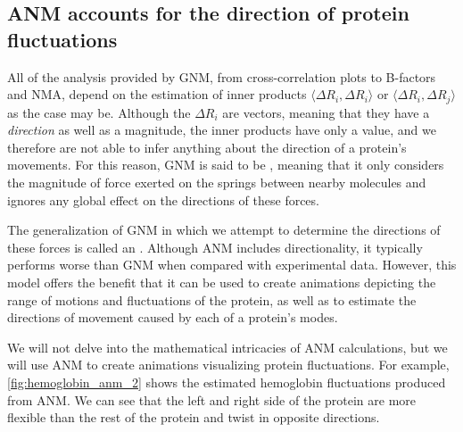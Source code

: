 \subsection{ANM accounts for the direction of protein fluctuations}

All of the analysis provided by GNM, from cross-correlation plots to B-factors and NMA, depend on the estimation of inner products $ \langle \Delta R_i, \Delta R_i \rangle $ or $ \langle \Delta R_i, \Delta R_j \rangle $ as the case may be. Although the $ \Delta R_i $ are vectors, meaning that they have a \textit{direction} as well as a magnitude, the inner products have only a value, and we therefore are not able to infer anything about the direction of a protein's movements. For this reason, GNM is said to be , meaning that it only considers the magnitude of force exerted on the springs between nearby molecules and ignores any global effect on the directions of these forces.

The generalization of GNM in which we attempt to determine the directions of these forces is called an . Although ANM includes directionality, it typically performs worse than GNM when compared with experimental data. However, this model offers the benefit that it can be used to create animations depicting the range of motions and fluctuations of the protein, as well as to estimate the directions of movement caused by each of a protein's modes.

We will not delve into the mathematical intricacies of ANM calculations, but we will use ANM to create animations visualizing protein fluctuations. For example, \autoref{fig:hemoglobin_anm_2} shows the estimated hemoglobin fluctuations produced from ANM. We can see that the left and right side of the protein are more flexible than the rest of the protein and twist in opposite directions.

